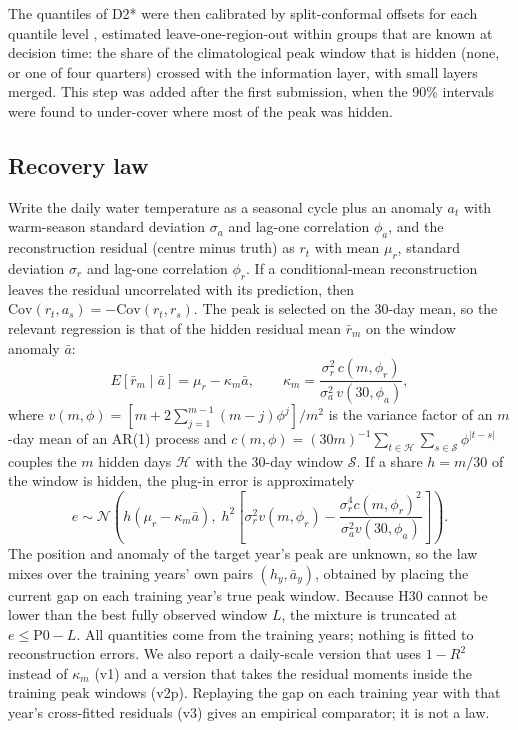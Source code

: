 \documentclass[draft]{agujournal2025}
\begin{document}
The quantiles of D2* were then calibrated by split-conformal offsets for each quantile level \cite{romano2019}, estimated leave-one-region-out within groups that are known at decision time: the share of the climatological peak window that is hidden (none, or one of four quarters) crossed with the information layer, with small layers merged. This step was added after the first submission, when the 90\% intervals were found to under-cover where most of the peak was hidden.

\subsection{Recovery law}
Write the daily water temperature as a seasonal cycle plus an anomaly $a_t$ with warm-season standard deviation $\sigma_a$ and lag-one correlation $\phi_a$, and the reconstruction residual (centre minus truth) as $r_t$ with mean $\mu_r$, standard deviation $\sigma_r$ and lag-one correlation $\phi_r$. If a conditional-mean reconstruction leaves the residual uncorrelated with its prediction, then $\mathrm{Cov}(r_t, a_s) = -\mathrm{Cov}(r_t, r_s)$. The peak is selected on the 30-day mean, so the relevant regression is that of the hidden residual mean $\bar r_m$ on the window anomaly $\bar a$:
\begin{equation}
E[\bar r_m \mid \bar a] = \mu_r - \kappa_m \bar a, \qquad \kappa_m = \frac{\sigma_r^2\, c(m,\phi_r)}{\sigma_a^2\, v(30,\phi_a)},
\end{equation}
where $v(m,\phi) = [m + 2\sum_{j=1}^{m-1}(m-j)\phi^j]/m^2$ is the variance factor of an $m$-day mean of an AR(1) process and $c(m,\phi) = (30m)^{-1}\sum_{t\in\mathcal H}\sum_{s\in\mathcal S}\phi^{|t-s|}$ couples the $m$ hidden days $\mathcal H$ with the 30-day window $\mathcal S$. If a share $h=m/30$ of the window is hidden, the plug-in error is approximately
\begin{equation}
e \sim \mathcal N\!\left(h(\mu_r - \kappa_m \bar a),\; h^2\left[\sigma_r^2 v(m,\phi_r) - \frac{\sigma_r^4 c(m,\phi_r)^2}{\sigma_a^2 v(30,\phi_a)}\right]\right).
\end{equation}
The position and anomaly of the target year's peak are unknown, so the law mixes over the training years' own pairs $(h_y, \bar a_y)$, obtained by placing the current gap on each training year's true peak window. Because H30 cannot be lower than the best fully observed window $L$, the mixture is truncated at $e \le \mathrm{P0} - L$. All quantities come from the training years; nothing is fitted to reconstruction errors. We also report a daily-scale version that uses $1-R^2$ instead of $\kappa_m$ (v1) and a version that takes the residual moments inside the training peak windows (v2p). Replaying the gap on each training year with that year's cross-fitted residuals (v3) gives an empirical comparator; it is not a law.
\end{document}
